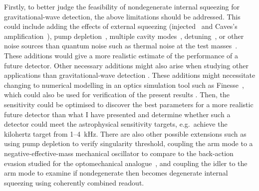 Firstly, to better judge the feasibility of nondegenerate internal squeezing for gravitational-wave detection, the above limitations should be addressed. This could include adding the effects of external squeezing (injected~\cite{} and Caves's amplification~\cite{}), pump depletion~\cite{}, multiple cavity modes~\cite{Li2021,}, detuning~\cite{}, or other noise sources than quantum noise such as thermal noise at the test masses~\cite{}. These additions would give a more realistic estimate of the performance of a future detector. Other necessary additions might also arise when studying other applications than gravitational-wave detection . These additions might necessitate changing to numerical modelling in an optics simulation tool such as Finesse~\cite{}, which could also be used for verification of the present results . Then, the sensitivity could be optimised to discover the best parameters for a more realistic future detector than what I have presented and determine whether such a detector could meet the astrophysical sensitivity targets, e.g.\ achieve the kilohertz target from 1--4~kHz.
There are also other possible extensions such as using pump depletion to verify singularity threshold, coupling the arm mode to a negative-effective-mass mechanical oscillator to compare to the back-action evasion studied for the optomechanical analogue~\cite{}, and coupling the idler to the arm mode to examine if nondegenerate then becomes degenerate internal squeezing using coherently combined readout.


